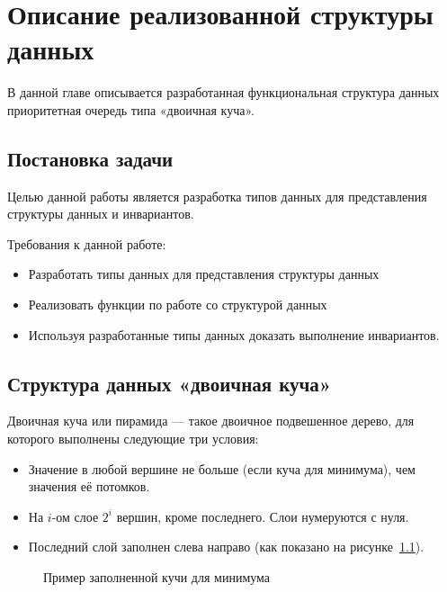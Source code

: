 \chapter{Описание реализованной структуры данных}
\label{chapter2}

В данной главе описывается разработанная функциональная структура данных приоритетная очередь типа «двоичная куча».

\section{Постановка задачи}
Целью данной работы является разработка типов данных для представления
структуры данных и инвариантов.

Требования к данной работе:
\begin{itemize}
 \item Разработать типы данных для представления структуры данных
 \item Реализовать функции по работе со структурой данных
 \item Используя разработанные типы данных доказать выполнение инвариантов.
\end{itemize}

\section{Структура данных «двоичная куча»}

\begin{definition}
Двоичная куча или пирамида \cite{DBLP:books/mg/CormenLRS01} — такое двоичное подвешенное дерево, для которого выполнены следующие три условия:
\begin{itemize}
 \item Значение в любой вершине не больше (если куча для минимума), чем значения её потомков.
 \item На $i$-ом слое $2^i$ вершин, кроме последнего. Слои нумеруются с нуля.
 \item Последний слой заполнен слева направо (как показано на рисунке~\ref{pic:min-heap}).
\end{itemize}
\end{definition}

\begin{figure}[h!]
  \caption{Пример заполненной кучи для минимума}
  \label{pic:min-heap}
\end{figure} 


